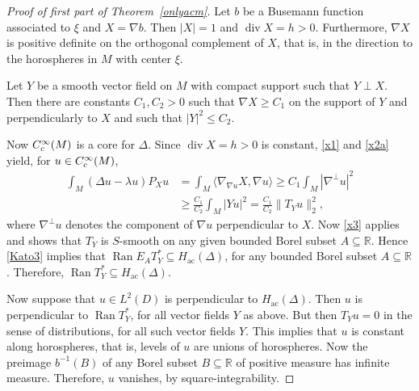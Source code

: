 \documentclass[11pt]{article}
\numberwithin{equation}{section}
\numberwithin{equation}{section}
\DeclareMathOperator{\diver}{div}
\DeclareMathOperator{\ran}{Ran}
\def\ac{\mathrm{ac}}
\def\R{\mathbb R}
\begin{document}
\begin{proof}[Proof of first part of Theorem~\ref{onlyacm}]
Let $b$ be a Busemann function associated to $\xi$ and ${X=\nabla b}$.
Then $|X|=1$ and $\diver X=h>0$.
Furthermore, $\nabla X$ is positive definite on the orthogonal complement of $X$,
that is, in the direction to the horospheres in $M$ with center $\xi$.

Let $Y$ be a smooth vector field on $M$ with compact support such that $Y\perp X$.
Then there are constants $C_1,C_2>0$ such that $\nabla X\ge C_1$ on the support of $Y$ and perpendicularly to $X$
and such that $|Y|^2\le C_2$.

Now $C^\infty_{\rm c}(M)$ is a core for $\Delta$.
Since $\diver X=h>0$ is constant, \eqref{x1} and \eqref{x2a} yield, for $u\in C^\infty_{\rm c}(M)$,
\begin{align*}
 \int_M (\Delta u-\lambda u) P_Xu
 &= \int_M \langle\nabla_{\nabla u}X,\nabla u\rangle \ge C_1 \int_M|\nabla^\bot u|^2 \\
 &\ge \frac{C_1}{C_2}\int_M|Yu|^2 = \frac{C_1}{C_2}\|T_Yu\|_2^2,
\end{align*}
where $\nabla^\bot u$ denotes the component of $\nabla u$ perpendicular to $X$.
Now \eqref{x3} applies and shows that $T_Y$ is $S$-smooth on any given bounded Borel subset $A\subseteq\R$.
Hence \eqref{Kato3} implies that $\ran E_AT_Y^*\subseteq H_{\ac}(\Delta)$,
for any bounded Borel subset $A\subseteq\R$.
Therefore, $\ran T_Y^*\subseteq H_{\ac}(\Delta)$.

Now suppose that $u\in L^2(D )$ is perpendicular to $H_{\ac}(\Delta)$.
Then $u$ is perpendicular to $\ran T_Y^*$, for all vector fields $Y$ as above.
But then $T_Yu=0$ in the sense of distributions, for all such vector fields $Y$.
This implies that $u$ is constant along horospheres, that is, levels of $u$ are unions of horospheres.
Now the preimage $b^{-1}(B)$ of any Borel subset $B\subseteq\R$ of positive measure has infinite measure.
Therefore, $u$ vanishes, by square-integrability.
\end{proof}
\end{document}
